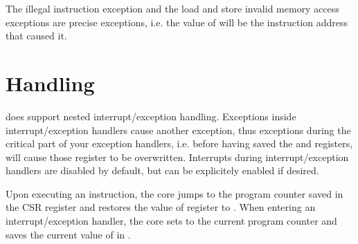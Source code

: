 The illegal instruction exception and the load and store invalid memory access
exceptions are precise exceptions, i.e. the value of  will be the
instruction address that caused it.

\section{Handling}

\rvcore does support nested interrupt/exception handling. Exceptions inside
interrupt/exception handlers cause another exception, thus exceptions during the
critical part of your exception handlers, i.e. before having saved the
 and  registers, will cause those register to be
overwritten.
Interrupts during interrupt/exception handlers are disabled by default, but can
be explicitely enabled if desired.

Upon executing an  instruction, the core jumps to the program
counter saved in the CSR register  and restores the value of
register  to . When entering an
interrupt/exception handler, the core sets  to the current program
counter and saves the current value of  in .
